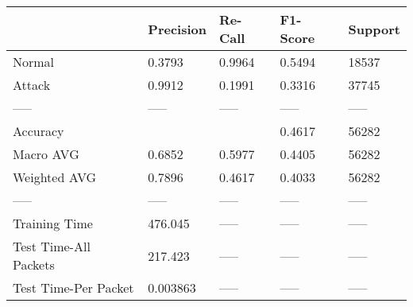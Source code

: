 \begin{tabular}{lllll}
\toprule
{} & Precision & Re-Call & F1-Score & Support \\
\midrule
Normal                &    0.3793 &  0.9964 &   0.5494 &   18537 \\
Attack                &    0.9912 &  0.1991 &   0.3316 &   37745 \\
-----                 &     ----- &   ----- &    ----- &   ----- \\
Accuracy              &           &         &   0.4617 &   56282 \\
Macro AVG             &    0.6852 &  0.5977 &   0.4405 &   56282 \\
Weighted AVG          &    0.7896 &  0.4617 &   0.4033 &   56282 \\
-----                 &     ----- &   ----- &    ----- &   ----- \\
Training Time         &   476.045 &   ----- &    ----- &   ----- \\
Test Time-All Packets &   217.423 &   ----- &    ----- &   ----- \\
Test Time-Per Packet  &  0.003863 &   ----- &    ----- &   ----- \\
\bottomrule
\end{tabular}
